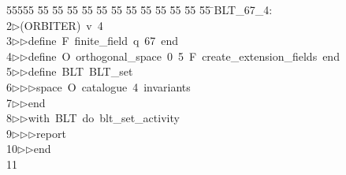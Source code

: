 %
%
\begin{tabbing}
55555 \= 55 \= 55 \= 55 \= 55 \= 55 \= 55 \= 55 \= 55 \= 55 \= 55 \= 55 \= 55 \= \>BLT\_67\_4:\\[0pt]
2\>$\triangleright$\>(ORBITER)\ v\ 4\ \\[0pt]
3\>$\triangleright$\>$\triangleright$\>define\ F\ finite\_field\ q\ 67\ end\ \\[0pt]
4\>$\triangleright$\>$\triangleright$\>define\ O\ orthogonal\_space\ 0\ 5\ F\ create\_extension\_fields\ end\ \\[0pt]
5\>$\triangleright$\>$\triangleright$\>define\ BLT\ BLT\_set\ \\[0pt]
6\>$\triangleright$\>$\triangleright$\>$\triangleright$\>space\ O\ catalogue\ 4\ invariants\ \\[0pt]
7\>$\triangleright$\>$\triangleright$\>end\ \\[0pt]
8\>$\triangleright$\>$\triangleright$\>with\ BLT\ do\ blt\_set\_activity\ \\[0pt]
9\>$\triangleright$\>$\triangleright$\>$\triangleright$\>report\ \\[0pt]
10\>$\triangleright$\>$\triangleright$\>end\\[0pt]
11\>\end{tabbing}
